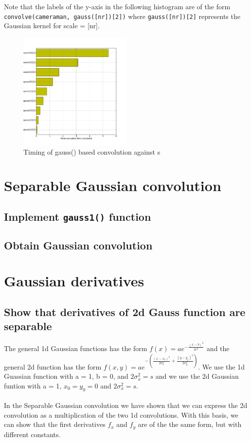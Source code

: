 \documentclass[abstract=true]{scrartcl}
\begin{document}
        Note that the labels of the y-axis in the following histogram are of the
        form \texttt{convolve(cameraman, gauss([nr])[2])} where
        \texttt{gauss([nr])[2]} represents the Gaussian kernel for scale = [nr].
        
        \begin{figure}
          \centering
          \includegraphics[width=0.5\textwidth]{../images/3_time_gauss}
          \caption{Timing of gauss() based convolution against s}
        \end{figure}


\section{Separable Gaussian convolution}

    \subsection{Implement \texttt{gauss1()} function}

    \subsection{Obtain Gaussian convolution}


\section{Gaussian derivatives}

    \subsection{Show that derivatives of 2d Gauss function are separable}
    
    The general 1d Gaussian functions has the form 
    $ f(x) = a e^{- { \frac{(x-b)^2 }{ 2 c^2} } } $ 
    and the general 2d function has the form 
    $ f(x,y) = a e^{- \left(\frac{(x-x_o)^2}{2\sigma_x^2} + \frac{(y-y_o)^2}{2\sigma_y^2} \right)} $. 
    We use the 1d Guassian function with a = 1, b = 0, and $ 2\sigma_x^2 = s $ and
    we use the 2d Gaussian funtion with a = 1, $ x_0 = y_0 = 0 $ and $ 2\sigma_x^2 = s $.\\
    \\
    In the Separable Gaussian convolution we have shown that we can express the
    2d convolution as a multiplication of the two 1d convolutions. With this 
    basis, we can show that the first derivatives $f_x$ and $f_y$ are of the the 
    same form, but with different constants. 
\end{document}
